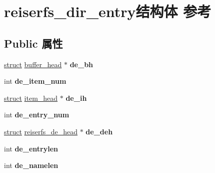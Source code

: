 \hypertarget{structreiserfs__dir__entry}{}\section{reiserfs\+\_\+dir\+\_\+entry结构体 参考}
\label{structreiserfs__dir__entry}
\subsection*{Public 属性}
\begin{DoxyCompactItemize}
\item 
\mbox{\label{structreiserfs__dir__entry_ac3cb28e974a71ffe623baa7be0ad912a}} 
\hyperlink{interfacestruct}{struct} \hyperlink{structbuffer__head}{buffer\+\_\+head} $\ast$ {\bfseries de\+\_\+bh}
\item 
\mbox{\label{structreiserfs__dir__entry_a492cdbc187daf50f0338e7797941a0f2}} 
int {\bfseries de\+\_\+item\+\_\+num}
\item 
\mbox{\label{structreiserfs__dir__entry_acd51d1e2e65da99a4a8f0ba108256527}} 
\hyperlink{interfacestruct}{struct} \hyperlink{structitem__head}{item\+\_\+head} $\ast$ {\bfseries de\+\_\+ih}
\item 
\mbox{\label{structreiserfs__dir__entry_a8b42a6a2acd45e1223a6f29ad8a85344}} 
int {\bfseries de\+\_\+entry\+\_\+num}
\item 
\mbox{\label{structreiserfs__dir__entry_a96bc4535e91087e743626ad79b6f656a}} 
\hyperlink{interfacestruct}{struct} \hyperlink{structreiserfs__de__head}{reiserfs\+\_\+de\+\_\+head} $\ast$ {\bfseries de\+\_\+deh}
\item 
\mbox{\label{structreiserfs__dir__entry_ab492a0cded7be46124b42816a5d29896}} 
int {\bfseries de\+\_\+entrylen}
\item 
\mbox{\label{structreiserfs__dir__entry_a597bfef6af11143160d780c956d1388e}} 
int {\bfseries de\+\_\+namelen}
\item 
\mbox{\label{structreiserfs__dir__entry_aea5d81abbaf4948e74d74a0b95f4c582}} 

\end{DoxyCompactItemize}

